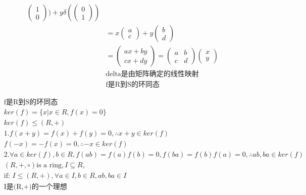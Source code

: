 \documentclass[12pt, a4paper]{article}  %
\begin{document}
\begin{align}
\begin{pmatrix}
        1\\0
    \end{pmatrix})+y \delta (\begin{pmatrix}
        0\\1
    \end{pmatrix})\\
    &=x\begin{pmatrix}
        a\\c
    \end{pmatrix}+y\begin{pmatrix}
        b\\d
    \end{pmatrix}\\
    &=\begin{pmatrix}
        ax+by\\cx+dy
    \end{pmatrix}=\begin{pmatrix}
        a&b\\
        c&d
    \end{pmatrix}\begin{pmatrix}
        x\\y
    \end{pmatrix}\\
    &\text{delta是由矩阵确定的线性映射}\\
    &\text{f是R到S的环同态}
\end{align}

\begin{align}
    &\text{f是R到S的环同态}\\
    &ker(f)=\{x|x\in R,f(x)=0\}\\
    &ker(f)\leqslant (R,+)\\
    &1.f(x+y)=f(x)+f(y)=0,\therefore x+y\in ker(f)\\
    &f(-x)=-f(x)=0,\therefore -x\in ker(f)\\
    &2.\forall a\in ker(f),b\in R,f(ab)=f(a)f(b)=0,f(ba)=f(b)f(a)=0,\therefore ab,ba\in ker(f)\\
    &(R,+,\circ)\text{is a ring},I\subseteq R,\\
    &\text{if: }I\leqslant (R,+),\forall a\in I,b\in R,ab,ba\in I\\
    &\text{I是(R,+)的一个理想}
\end{align}
\end{document}
